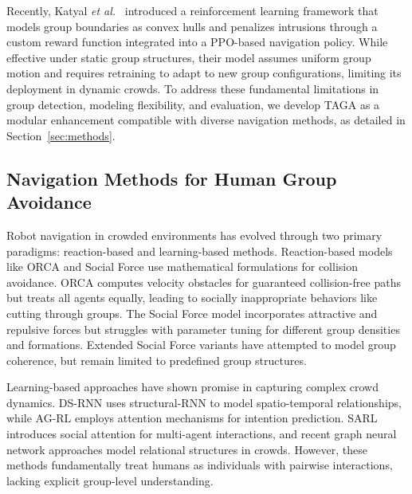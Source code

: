 Recently, Katyal \textit{et al.}~\cite{group-aware} introduced a reinforcement learning framework that models group boundaries as convex hulls and penalizes intrusions through a custom reward function integrated into a PPO-based navigation policy. 
While effective under static group structures, their model assumes uniform group motion and requires retraining to adapt to new group configurations, limiting its deployment in dynamic crowds.
To address these fundamental limitations in group detection, modeling flexibility, and evaluation, we develop TAGA as a modular enhancement compatible with diverse navigation methods, as detailed in Section~\ref{sec:methods}.



\subsection{Navigation Methods for Human Group Avoidance}

Robot navigation in crowded environments has evolved through two primary paradigms: reaction-based and learning-based methods. Reaction-based models like ORCA \cite{orca} and Social Force \cite{helbing1995social} use mathematical formulations for collision avoidance. ORCA computes velocity obstacles for guaranteed collision-free paths but treats all agents equally, leading to socially inappropriate behaviors like cutting through groups. The Social Force model incorporates attractive and repulsive forces \cite{ferrer2013robot} but struggles with parameter tuning for different group densities and formations. Extended Social Force variants \cite{zanlungo2011social} have attempted to model group coherence, but remain limited to predefined group structures.

Learning-based approaches have shown promise in capturing complex crowd dynamics. DS-RNN \cite{liu2020decentralized} uses structural-RNN to model spatio-temporal relationships, while AG-RL \cite{liu2023intention} employs attention mechanisms for intention prediction. SARL \cite{chen2019crowd} introduces social attention for multi-agent interactions, and recent graph neural network approaches \cite{wang2023learning} model relational structures in crowds. However, these methods fundamentally treat humans as individuals with pairwise interactions, lacking explicit group-level understanding.

